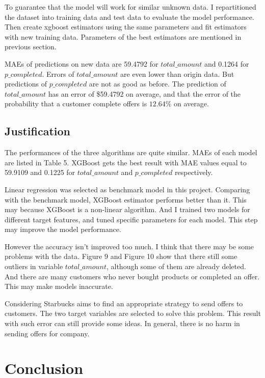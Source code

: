 \documentclass[a4paper,12pt]{article}
\begin{document}
To guarantee that the model will work for similar unknown data. I repartitioned the dataset into training data and test 
data to evaluate the model performance. Then create xgboost estimators using the same parameters and fit estimators with new 
training data. Parameters of the best estimators are mentioned in previous section.

MAEs of predictions on new data are 59.4792 for $total\_amount$ and 0.1264 for $p\_completed$. Errors of $total\_amount$ are 
even lower than origin data. But predictions of $p\_completed$ are not as good as before. The prediction of $total\_amount$ has 
an error of \$59.4792 on average, and that the error of the probability that a customer complete offers is $12.64\%$ on average.

\subsection*{Justification}

The performances of the three algorithms are quite similar. MAEs of each model are listed in Table 5. XGBoost gets the best 
result with MAE values equal to 59.9109 and 0.1225 for $total\_amount$ and $p\_completed$ respectively.

Linear regression was selected as benchmark model in this project. Comparing with the benchmark model, XGBoost estimator 
performs better than it. This may because XGBoost is a non-linear algorithm. And I trained two models for different target 
features, and tuned specific parameters for each model. This step may improve the model performance. 

However the accuracy isn't improved too much. I think that there may be some problems with the data. Figure 9 and Figure 10 show 
that there still some outliers in variable $total\_amount$, although some of them are already deleted. And there are many 
customers who never bought products or completed an offer. This may make models inaccurate.

Considering Starbucks aims to find an appropriate strategy to send offers to customers. The two target variables are selected to 
solve this problem. This result with such error can still provide some ideas. In general, there is no harm in sending offers for 
company.

\section{Conclusion}
\end{document}
